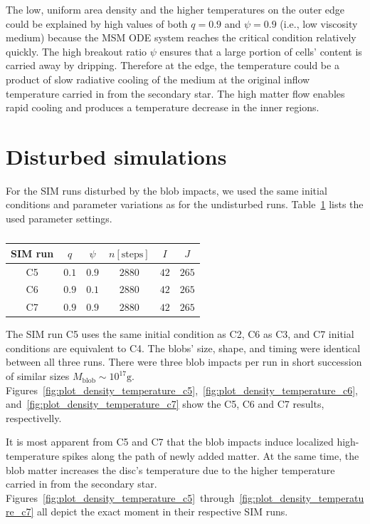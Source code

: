     The low, uniform area density and the higher temperatures on the outer edge could be explained by high values of both $q = 0.9$ and $\psi = 0.9$ (i.e., low viscosity medium) because the MSM ODE system reaches the critical condition relatively quickly. The high breakout ratio $\psi$ ensures that a large portion of cells' content is carried away by dripping. Therefore at the edge, the temperature could be a product of slow radiative cooling of the medium at the original inflow temperature carried in from the secondary star. The high matter flow enables rapid cooling and produces a temperature decrease in the inner regions.

\section{Disturbed simulations}
    For the SIM runs disturbed by the blob impacts, we used the same initial conditions and parameter variations as for the undisturbed runs. Table~\ref{tab:table_simultation_cases_disturbed} lists the used parameter settings.

    \begin{table}[ht]
    \centering
    \begin{tabular*}{\columnwidth}{@{\extracolsep{\fill}}cccccc}
        SIM run & $q$ & $\psi$ & $n [\mathrm{steps}]$ & $I$ & $J$ \\ 
    \hline\hline
        C5 & $0.1$ & $0.9$ & $2880$ & $42$ & $265$ \\
        C6 & $0.9$ & $0.1$ & $2880$ & $42$ & $265$ \\
        C7 & $0.9$ & $0.9$ & $2880$ & $42$ & $265$ \\
    \hline
    \end{tabular*}
    \caption{}
    \label{tab:table_simultation_cases_disturbed}
    \end{table}

    The SIM run C5 uses the same initial condition as C2, C6 as C3, and C7 initial conditions are equivalent to C4. The blobs' size, shape, and timing were identical between all three runs. There were three blob impacts per run in short succession of similar sizes $M_{\mathrm{blob}}\sim 10^{17} \si{\gram}$. Figures~\ref{fig:plot_density_temperature_c5},~\ref{fig:plot_density_temperature_c6},~and~\ref{fig:plot_density_temperature_c7} show the C5, C6 and C7 results, respectivelly.

    It is most apparent from C5 and C7 that the blob impacts induce localized high-temperature spikes along the path of newly added matter. At the same time, the blob matter increases the disc's temperature due to the higher temperature carried in from the secondary star. Figures~\ref{fig:plot_density_temperature_c5}~through~\ref{fig:plot_density_temperature_c7} all depict the exact moment in their respective SIM runs.

